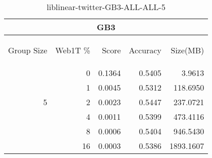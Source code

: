 \begin{center}
\begin{table}[htbp] 
 \begin{center}
\begin{tabular}{ | r | r | r | r | r |}
\hline
\multicolumn{5}{|c|}{GB3}\\
\hline
\begin{sideways}Group Size\end{sideways} & \begin{sideways}Web1T \%\end{sideways} & \begin{sideways}Score\end{sideways} & \begin{sideways}Accuracy\end{sideways} & \begin{sideways}Size(MB)\end{sideways}\\
\hline
\multirow{5}{*}{5}
 & 0 & 0.1364 & 0.5405 & 3.9613\\ \cline{2-5}
 & 1 & 0.0045 & 0.5312 & 118.6950\\ \cline{2-5}
 & 2 & 0.0023 & 0.5447 & 237.0721\\ \cline{2-5}
 & 4 & 0.0011 & 0.5399 & 473.4116\\ \cline{2-5}
 & 8 & 0.0006 & 0.5404 & 946.5430\\ \cline{2-5}
 & 16 & 0.0003 & 0.5386 & 1893.1607\\ \cline{2-5}
\hline
\end{tabular}
\caption{liblinear-twitter-GB3-ALL-ALL-5}
\label{table:liblinear-twitter-GB3-ALL-ALL-5}
\end{center}
 \end{table}
\end{center}

